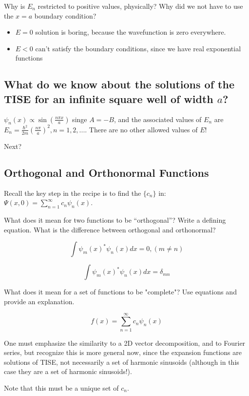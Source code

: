 \documentclass{article}
\begin{document}
Why is $E_n$ restricted to positive values, physically? Why did we not have to use the $x = a$ boundary condition?

\begin{itemize}
    \item $E=0$ solution is boring, because the wavefunction is zero everywhere. 
    \item $E < 0$ can't satisfy the boundary conditions, since we have real exponential functions
\end{itemize}

\subsection*{What do we know about the solutions of the TISE for an infinite square well of width $a$?}

$\psi_n(x) \propto \sin \left( \frac{n \pi x}{a} \right)$ singe $A = -B$, and the associated values of $E_n$ are $E_n = \frac{\hbar^2}{2m} \left( \frac{n \pi}{a} \right)^2, n = 1,2,...$. There are no other allowed values of $E$!

Next?

\subsection{Orthogonal and Orthonormal Functions}

Recall the key step in the recipe is to find the $\{c_n\}$ in: $\Psi(x,0) = \sum_{n=1}^\infty c_n \psi_n(x)$.

What does it mean for two functions to be “orthogonal”? Write a defining equation.  What is the difference between orthogonal and orthonormal? 

$$\int \psi_m(x)^* \psi_n(x) dx = 0, (m \neq n)$$

$$\int \psi_m(x)^* \psi_n(x) dx = \delta_{mn}$$

What does it mean for a set of functions to be "complete"? Use equations and provide an explanation. 

$$f(x) = \sum_{n=1}^\infty c_n \psi_n(x)$$

One must emphasize the similarity to a 2D vector decomposition, and to Fourier series, but recognize this is more general now, since the expansion functions are solutions of TISE, not necessarily a set of harmonic sinusoids (although in this case they are a set of harmonic sinusoids!). 

Note that this must be a unique set of $c_n$. 
\end{document}

